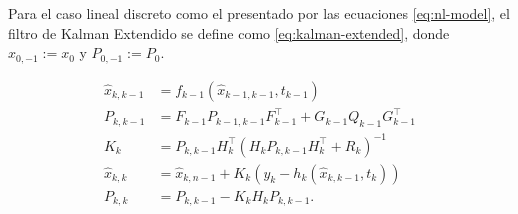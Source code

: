 


\begin{mdframed}[style=mystyle,frametitle=Filtro de Kalman Extendido (EKF)]

Para el caso lineal discreto como el presentado por las ecuaciones \ref{eq:nl-model}, el filtro de Kalman Extendido se define como \ref{eq:kalman-extended}, donde \(\hat{x}_{0,-1}:= x_0\) y \(P_{0,-1}:= P_0\). 

\begin{equation}\label{eq:kalman-extended}
\begin{aligned}
\hat{x}_{k,k-1} &= f_{k-1}( \hat{x}_{k-1,k-1}, t_{k-1}) \\
P_{k,k-1} &= F_{k-1} P_{k-1,k-1} F_{k-1}^{\top} + G_{k-1} Q_{k-1} G_{k-1}^{\top}\\
K_k &= P_{k,k-1} H^{\top}_{k}(H_{k}P_{k,k-1}H_{k}^{\top} + R_k)^{-1}\\
\hat{x}_{k,k} &= \hat{x}_{k, n-1} + K_k(y_k-h_k(\hat{x}_{k,k-1}, t_k)) \\
P_{k,k} &= P_{k,k-1}- K_k H_{k}P_{k,k-1}. \\
\end{aligned}
\end{equation}
\end{mdframed}




